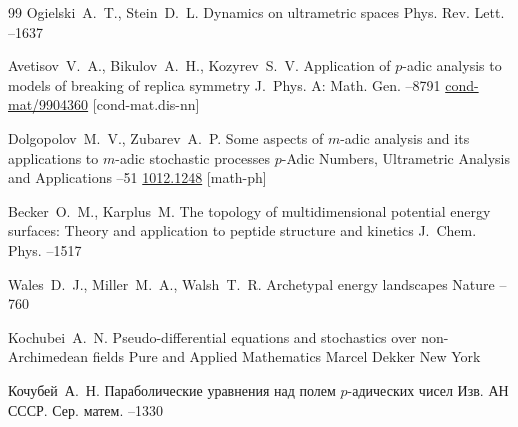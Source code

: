 \begin{thebibliography}{99}
\by Ogielski~A.~T., Stein~D.~L.
\paper Dynamics on ultrametric spaces
\jour Phys. Rev. Lett.
--1637

\by Avetisov~V.~A., Bikulov~A.~H., Kozyrev~S.~V.
\paper Application of $p$-adic analysis to models of breaking of replica symmetry
\jour J.~Phys. A: Math. Gen.
--8791
\moreref
\arxiv \href{http://arxiv.org/abs/cond-mat/9904360}{cond-mat/9904360} [cond-mat.dis-nn]

\by Dolgopolov~M.~V., Zubarev~A.~P.
\paper Some aspects of $m$-adic analysis and its applications to $m$-adic stochastic processes
\jour $p$-Adic Numbers, Ultrametric Analysis and Applications
--51
\moreref
\arxiv \href{http://arxiv.org/abs/1012.1248}{1012.1248} [math-ph]

\by Becker~O.~M., Karplus~M.
\paper The topology of multidimensional potential energy surfaces: Theory and application to peptide structure and kinetics
\jour J.~Chem. Phys.
--1517

\by Wales~D.~J., Miller~M.~A., Walsh~T.~R.
\paper Archetypal energy landscapes
\jour Nature
--760

\by Kochubei~A.~N.
\book Pseudo-differential equations and stochastics over non-Archimedean fields
\serial Pure and Applied Mathematics
\publ Marcel Dekker
\publaddr New York

\by Кочубей~А.~Н.
\paper Параболические уравнения над полем $p$-адических чисел
\jour Изв. АН СССР. Сер. матем.
--1330




\end{thebibliography}

